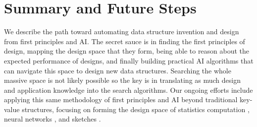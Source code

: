 \documentclass[11pt]{article}
\begin{document}
\section{Summary and Future Steps}
We describe the path toward automating data structure invention and design from first principles and AI. The secret sauce is in finding the first principles of design, mapping the design space that they form, being able to reason about the expected performance of designs, and finally building practical AI algorithms that can navigate this space to design new data structures. Searching the whole massive space is not likely possible so the key is in translating as much design and application knowledge into the search algorithms. Our ongoing efforts include applying this same methodology of first principles and AI beyond traditional key-value structures, focusing on forming the design space of statistics computation \cite{Wasay2017}, neural networks \cite{Wasay2018}, and sketches \cite{Hentschel2018}.
\end{document}
